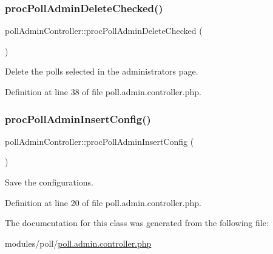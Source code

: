 \subsubsection{\texorpdfstring{proc\+Poll\+Admin\+Delete\+Checked()}{procPollAdminDeleteChecked()}}
{\footnotesize\ttfamily poll\+Admin\+Controller\+::proc\+Poll\+Admin\+Delete\+Checked (\begin{DoxyParamCaption}{ }\end{DoxyParamCaption})}



Delete the polls selected in the administrator\textquotesingle{}s page. 



Definition at line 38 of file poll.\+admin.\+controller.\+php.

\mbox{\label{classpollAdminController_ab34f3cb8a5b40217ed0acdaaa11ee0ad}} 
\subsubsection{\texorpdfstring{proc\+Poll\+Admin\+Insert\+Config()}{procPollAdminInsertConfig()}}
{\footnotesize\ttfamily poll\+Admin\+Controller\+::proc\+Poll\+Admin\+Insert\+Config (\begin{DoxyParamCaption}{ }\end{DoxyParamCaption})}



Save the configurations. 



Definition at line 20 of file poll.\+admin.\+controller.\+php.



The documentation for this class was generated from the following file\+:\begin{DoxyCompactItemize}
\item 
modules/poll/\hyperlink{poll_8admin_8controller_8php}{poll.\+admin.\+controller.\+php}\end{DoxyCompactItemize}
